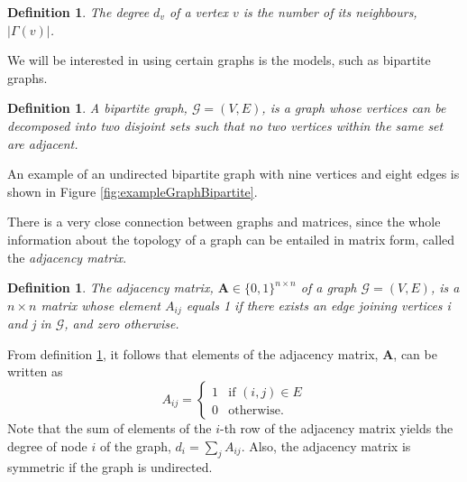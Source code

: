 \documentclass[12pt]{article}
\numberwithin{equation}{section}
\newtheorem{definition}[theorem]{Definition}
\newcommand*\matvar[1]{\mathbf#1}
\newcommand*\graphvar[1]{\mathcal#1}
\newcommand*\abs[1]{\left\vert#1\right\vert}
\begin{document}
\begin{definition}
\label{def:degreeNode}
	The degree $d_{v}$ of a vertex $v$ is the number of its neighbours, $\abs{\Gamma(v)}$.
\end{definition}
We will be interested in using certain graphs is the models, such as bipartite graphs.
\begin{definition}
\label{def:bipartiteGraph}
	A bipartite graph, $\graphvar{G} = (V,E)$, is a graph whose vertices can be decomposed into two disjoint sets such that no two vertices within the same set are adjacent.
\end{definition}
An example of an undirected bipartite graph with nine vertices and eight edges is shown in Figure \ref{fig:exampleGraphBipartite}.



There is a very close connection between graphs and matrices, since the whole information about the topology of a graph can be entailed in matrix form, called the \textit{adjacency matrix}.
\begin{definition}
	\label{def:adjacencyMatrix}
	The adjacency matrix, $\matvar{A} \in \{0,1\}^{n \times n}$ of a graph $\graphvar{G} = (V,E)$, is a $n\times n$ matrix whose element $A_{ij}$ equals 1 if there exists an edge joining vertices i and j in $\graphvar{G}$, and zero otherwise.
\end{definition}
From definition \ref{def:adjacencyMatrix}, it follows that elements of the adjacency matrix, $\matvar{A}$, can be written as
\begin{equation*}
	A_{ij} =
	\begin{cases}
		1 & \text{if } (i,j) \in E\\
		0 & \text{otherwise}.
	\end{cases}
\end{equation*}
Note that the sum of elements of the $i$-th row of the adjacency matrix yields the degree of node $i$ of the graph, $d_{i} = \sum_{j} A_{ij}$. Also, the adjacency matrix is symmetric if the graph is undirected.
\end{document}
